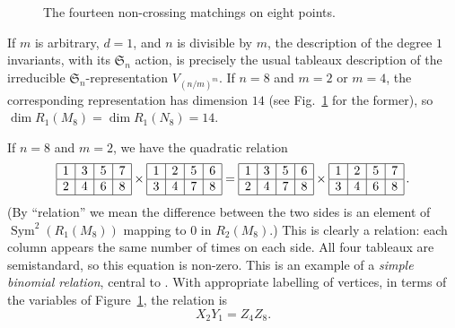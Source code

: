 \documentclass{amsart}
\theoremstyle{definition}
\theoremstyle{remark}
\DeclareMathOperator{\Sym}{Sym}
\def\SS{\mathfrak{S}}
\begin{document}
\begin{figure}[ht]
\begin{center}

\end{center}
\caption{The fourteen non-crossing matchings on eight points.}
\label{fig:noncross}
\end{figure}

If $m$ is arbitrary, $d=1$, and $n$ is divisible by $m$, the description of the degree $1$ invariants, with its $\SS_n$
action, is precisely the usual tableaux description of the irreducible $\SS_n$-representation $V_{(n/m)^m}$.  If $n=8$
and $m=2$ or $m=4$, the corresponding representation has dimension $14$ (see Fig.~\ref{fig:noncross} for the former),
so $\dim R_1(M_8) = \dim R_1(N_8) = 14$.

If $n=8$ and $m=2$, we have the quadratic relation
\begin{displaymath}
\begin{array}{|c|c|c|c|}  \hline
1 & 3 & 5 & 7 \\ \hline 
2 & 4 & 6 & 8 \\ \hline 
\end{array} \times 
\begin{array}{|c|c|c|c|}  \hline
1 & 2 & 5 & 6 \\ \hline 
3 & 4 & 7 & 8 \\ \hline 
\end{array} = 
\begin{array}{|c|c|c|c|}  \hline
1 & 3 & 5 & 6 \\ \hline 
2 & 4 & 7 & 8 \\ \hline 
\end{array} \times
\begin{array}{|c|c|c|c|}  \hline
1 & 2 & 5 & 7 \\ \hline 
3 & 4 & 6 & 8 \\ \hline 
\end{array} \, .
\end{displaymath}
(By ``relation'' we mean the difference between the two sides is an element of $\Sym^2(R_1(M_8))$ mapping to 0 in
$R_2(M_8)$.)
This is clearly a relation:  each column appears the same number of times on each side.  All four tableaux are
semistandard, so this equation is non-zero.  This is an example of a \emph{simple binomial relation}, central to
\cite{hmsv2}.  With appropriate labelling of vertices, in terms of the variables of Figure~\ref{fig:noncross}, the
relation is
\begin{equation}
\label{e:simplebinomial}
X_2 Y_1 = Z_4 Z_8.
\end{equation}
\end{document}
